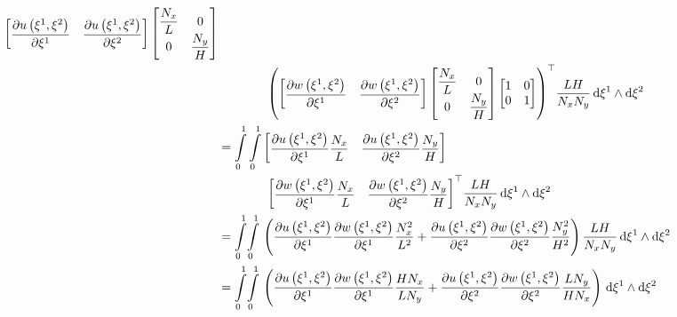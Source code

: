 \begin{equation}
\begin{aligned}
{\begin{bmatrix}
        \delby{\fnof{u}{\xione,\xitwo}}{\xione}&\delby{\fnof{u}{\xione,\xitwo}}{\xitwo}
      \end{bmatrix}\begin{bmatrix}
        \dfrac{N_{x}}{L} & 0 \\
        0 & \dfrac{N_{y}}{H}
    \end{bmatrix}} \\
    &\qquad\qquad\transpose{\pbrac{\begin{bmatrix}
          \delby{\fnof{w}{\xione,\xitwo}}{\xione}&\delby{\fnof{w}{\xione,\xitwo}}{\xitwo}
        \end{bmatrix}\begin{bmatrix}
          \dfrac{N_{x}}{L} & 0 \\
          0 & \dfrac{N_{y}}{H}
        \end{bmatrix}\begin{bmatrix}
          1 & 0 \\
          0 & 1
    \end{bmatrix}}}\dfrac{LH}{N_{x}N_{y}}\infinitesimaltwo{\xione}{\xitwo} \\
    &=\dintl{0}{1}\dintl{0}{1}\begin{bmatrix}
        \delby{\fnof{u}{\xione,\xitwo}}{\xione}\dfrac{N_{x}}{L}&\delby{\fnof{u}{\xione,\xitwo}}{\xitwo}\dfrac{N_{y}}{H}
      \end{bmatrix}\\
    &\qquad\qquad \transpose{\begin{bmatrix}
          \delby{\fnof{w}{\xione,\xitwo}}{\xione}\dfrac{N_{x}}{L}&\delby{\fnof{w}{\xione,\xitwo}}{\xitwo}\dfrac{N_{y}}{H}
      \end{bmatrix}}
      \dfrac{LH}{N_{x}N_{y}}\infinitesimaltwo{\xione}{\xitwo}\\
    &=\giint{0}{1}{0}{1}{\pbrac{\delby{\fnof{u}{\xione,\xitwo}}{\xione}\delby{\fnof{w}{\xione,\xitwo}}{\xione}
        \dfrac{N_{x}^{2}}{L^{2}}+\delby{\fnof{u}{\xione,\xitwo}}{\xitwo}\delby{\fnof{w}{\xione,\xitwo}}{\xitwo}
        \dfrac{N_{y}^{2}}{H^{2}}}\dfrac{LH}{N_{x}N_{y}}}{\xione}{\xitwo}\\
    &=\giint{0}{1}{0}{1}{\pbrac{\delby{\fnof{u}{\xione,\xitwo}}{\xione}\delby{\fnof{w}{\xione,\xitwo}}{\xione}
        \dfrac{H N_{x}}{L N_{y}}+\delby{\fnof{u}{\xione,\xitwo}}{\xitwo}\delby{\fnof{w}{\xione,\xitwo}}{\xitwo}
        \dfrac{L N_{y}}{H N_{x}}}}{\xione}{\xitwo}
  \end{aligned}
\end{equation}

